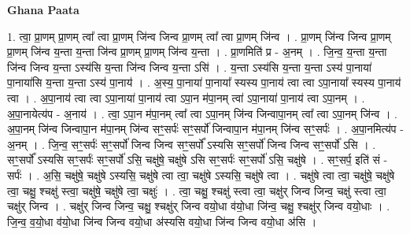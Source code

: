 \documentclass[17pt]{extarticle}
\begin{document}
\textbf{Ghana Paata } \newline

1. त्वा॒ प्रा॒णम् प्रा॒णम् त्वा᳚ त्वा प्रा॒णम् जि॑न्व जिन्व प्रा॒णम् त्वा᳚ त्वा प्रा॒णम् जि॑न्व । . प्रा॒णम् जि॑न्व जिन्व प्रा॒णम् प्रा॒णम् जि॑न्व य॒न्ता य॒न्ता जि॑न्व प्रा॒णम् प्रा॒णम् जि॑न्व य॒न्ता । . प्रा॒णमिति॑ प्र - अ॒नम् । . जि॒न्व॒ य॒न्ता य॒न्ता जि॑न्व जिन्व य॒न्ता ऽस्य॑सि य॒न्ता जि॑न्व जिन्व य॒न्ता ऽसि॑ । . य॒न्ता ऽस्य॑सि य॒न्ता य॒न्ता ऽस्य॑ पा॒नाया॑ पा॒नाया॑सि य॒न्ता य॒न्ता ऽस्य॑ पा॒नाय॑ । . अ॒स्य॒ पा॒नाया॑ पा॒नाया᳚ स्यस्य पा॒नाय॑ त्वा त्वा ऽपा॒नाया᳚ स्यस्य पा॒नाय॑ त्वा । . अ॒पा॒नाय॑ त्वा त्वा ऽपा॒नाया॑ पा॒नाय॑ त्वा ऽपा॒न म॑पा॒नम् त्वा॑ ऽपा॒नाया॑ पा॒नाय॑ त्वा ऽपा॒नम् । . अ॒पा॒नायेत्य॑प - अ॒नाय॑ । . त्वा॒ ऽपा॒न म॑पा॒नम् त्वा᳚ त्वा ऽपा॒नम् जि॑न्व जिन्वापा॒नम् त्वा᳚ त्वा ऽपा॒नम् जि॑न्व । . अ॒पा॒नम् जि॑न्व जिन्वापा॒न म॑पा॒नम् जि॑न्व सꣳ॒॒सर्पः॑ सꣳ॒॒सर्पो॑ जिन्वापा॒न म॑पा॒नम् जि॑न्व सꣳ॒॒सर्पः॑ । . अ॒पा॒नमित्य॑प - अ॒नम् । . जि॒न्व॒ सꣳ॒॒सर्पः॑ सꣳ॒॒सर्पो॑ जिन्व जिन्व सꣳ॒॒सर्पो᳚ ऽस्यसि सꣳ॒॒सर्पो॑ जिन्व जिन्व सꣳ॒॒सर्पो॑ ऽसि । . सꣳ॒॒सर्पो᳚ ऽस्यसि सꣳ॒॒सर्पः॑ सꣳ॒॒सर्पो॑ ऽसि॒ चक्षु॑षे॒ चक्षु॑षे ऽसि सꣳ॒॒सर्पः॑ सꣳ॒॒सर्पो॑ ऽसि॒ चक्षु॑षे । . सꣳ॒॒सर्प॒ इति॑ सं - सर्पः॑ । . अ॒सि॒ चक्षु॑षे॒ चक्षु॑षे ऽस्यसि॒ चक्षु॑षे त्वा त्वा॒ चक्षु॑षे ऽस्यसि॒ चक्षु॑षे त्वा । . चक्षु॑षे त्वा त्वा॒ चक्षु॑षे॒ चक्षु॑षे त्वा॒ चक्षु॒ श्चक्षु॑ स्त्वा॒ चक्षु॑षे॒ चक्षु॑षे त्वा॒ चक्षुः॑ । . त्वा॒ चक्षु॒ श्चक्षु॑ स्त्वा त्वा॒ चक्षु॑र् जिन्व जिन्व॒ चक्षु॑ स्त्वा त्वा॒ चक्षु॑र् जिन्व । . चक्षु॑र् जिन्व जिन्व॒ चक्षु॒ श्चक्षु॑र् जिन्व वयो॒धा व॑यो॒धा जि॑न्व॒ चक्षु॒ श्चक्षु॑र् जिन्व वयो॒धाः । . जि॒न्व॒ व॒यो॒धा व॑यो॒धा जि॑न्व जिन्व वयो॒धा अ॑स्यसि वयो॒धा जि॑न्व जिन्व वयो॒धा अ॑सि । \newline
\end{document}
